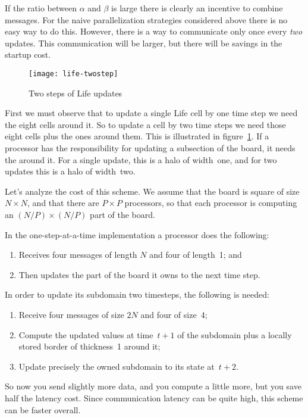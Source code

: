 If the ratio between $\alpha$ and $\beta$ is large there is clearly
an incentive to combine messages. For the naive parallelization
strategies considered above there is no easy way to do this.
However, there is a way to communicate only once every \emph{two} 
updates. This communication will be larger, but there
will be savings in the startup cost.

\begin{figure}[t]
  \texttt{[image: life-twostep]}
  \caption{Two steps of Life updates}
  \label{fig:twostep}
\end{figure}

First we must observe that to update a single Life cell 
by one time step we need the eight cells around it. So to update
a cell by two time steps we need those eight cells plus the ones around them.
This is illustrated in figure~\ref{fig:twostep}.
If a processor has the responsibility for updating a subsection of the board,
it needs the 
around it. For a single update, this is a halo of width~one, and
for two updates this is a halo of width~two.

Let's analyze the cost of this scheme. We assume that the board is
square of size $N\times N$, and that there are $P\times P$ processors,
so that each processor is computing an $(N/P)\times(N/P)$ part of the board.

In the one-step-at-a-time implementation a processor does the following:
\begin{enumerate}
\item Receives four messages of length $N$ and four of length~1; and
\item Then updates the part of the board it owns to the next time step.
\end{enumerate}
In order to update its subdomain two timesteps, the following is needed:
\begin{enumerate}
\item Receive four messages of size $2 N$ and four of size~4;
\item Compute the updated values at time~$t+1$ of the subdomain plus
  a locally stored border of thickness~1 around it;
\item Update precisely the owned subdomain to its state at~$t+2$.
\end{enumerate}
So now you send slightly more data, and you compute a little more,
but you save half the latency cost. Since communication latency can 
be quite high, this scheme can be faster overall.


